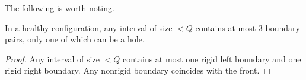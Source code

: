 \documentclass[12pt]{memoir}
\newcommand{\authnote}[3]
{\text{{ \textcolor{#3}{\( \langle\hspace{-0.2em}\langle \)\textsf{\footnotesize #1: #2}\( \rangle\hspace{-0.2em}\rangle \)}}}}
\newcommand{\authnote}[2]{}
\newcommand{\Pnote}[1]{{\authnote{P}{#1}{cyan}}}
\newcommand{\Inote}[1]{{\authnote{I}{#1}{blue}}}
\newcommand{\fld}[1]{\ensuremath{\textit{#1\/}}}
\def\B{B}
\newcommand{\Z}{Z}
\newcommand{\Addr}{\fld{Addr}}
\newcommand{\cAddr}{\fld{cAddr}}
\newcommand{\cKind}{\fld{cKind}}
\newcommand{\Sweep}{\fld{Sw}}
\newcommand{\cSweep}{\fld{cSw}}
\begin{document}
The following is worth noting.

\begin{lemma}
In a healthy configuration, any interval of size \( <Q \) contains at most 3 boundary pairs,
only one of which can be  a hole.
\end{lemma}
\begin{proof}
Any interval of size \( <Q \) contains at most one rigid left boundary and
one rigid right boundary.
Any nonrigid boundary coincides with the front.
\end{proof}


    

\end{document}
